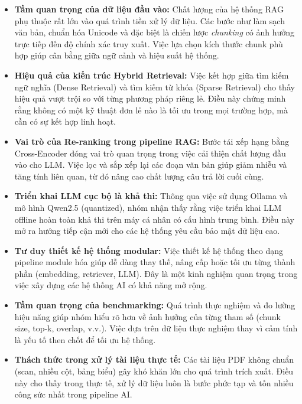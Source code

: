 ﻿\documentclass[10pt, conference, a4paper, compsocconf]{IEEEtran}
\begin{document}
\begin{itemize}

\item \textbf{Tầm quan trọng của dữ liệu đầu vào:} 
Chất lượng của hệ thống RAG phụ thuộc rất lớn vào quá trình tiền xử lý dữ liệu. Các bước như làm sạch văn bản, chuẩn hóa Unicode và đặc biệt là chiến lược \textit{chunking} có ảnh hưởng trực tiếp đến độ chính xác truy xuất. Việc lựa chọn kích thước chunk phù hợp giúp cân bằng giữa ngữ cảnh và hiệu suất hệ thống.

\item \textbf{Hiệu quả của kiến trúc Hybrid Retrieval:} 
Việc kết hợp giữa tìm kiếm ngữ nghĩa (Dense Retrieval) và tìm kiếm từ khóa (Sparse Retrieval) cho thấy hiệu quả vượt trội so với từng phương pháp riêng lẻ. Điều này chứng minh rằng không có một kỹ thuật đơn lẻ nào là tối ưu trong mọi trường hợp, mà cần có sự kết hợp linh hoạt.

\item \textbf{Vai trò của Re-ranking trong pipeline RAG:}
Bước tái xếp hạng bằng Cross-Encoder đóng vai trò quan trọng trong việc cải thiện chất lượng đầu vào cho LLM. Việc lọc và sắp xếp lại các đoạn văn bản giúp giảm nhiễu và tăng tính liên quan, từ đó nâng cao chất lượng câu trả lời cuối cùng.

\item \textbf{Triển khai LLM cục bộ là khả thi:}
Thông qua việc sử dụng Ollama và mô hình Qwen2.5 (quantized), nhóm nhận thấy rằng việc triển khai LLM offline hoàn toàn khả thi trên máy cá nhân có cấu hình trung bình. Điều này mở ra hướng tiếp cận mới cho các hệ thống yêu cầu bảo mật dữ liệu cao.

\item \textbf{Tư duy thiết kế hệ thống modular:}
Việc thiết kế hệ thống theo dạng pipeline module hóa giúp dễ dàng thay thế, nâng cấp hoặc tối ưu từng thành phần (embedding, retriever, LLM). Đây là một kinh nghiệm quan trọng trong việc xây dựng các hệ thống AI có khả năng mở rộng.

\item \textbf{Tầm quan trọng của benchmarking:}
Quá trình thực nghiệm và đo lường hiệu năng giúp nhóm hiểu rõ hơn về ảnh hưởng của từng tham số (chunk size, top-k, overlap, v.v.). Việc dựa trên dữ liệu thực nghiệm thay vì cảm tính là yếu tố then chốt để tối ưu hệ thống.

\item \textbf{Thách thức trong xử lý tài liệu thực tế:}
Các tài liệu PDF không chuẩn (scan, nhiều cột, bảng biểu) gây khó khăn lớn cho quá trình trích xuất. Điều này cho thấy trong thực tế, xử lý dữ liệu luôn là bước phức tạp và tốn nhiều công sức nhất trong pipeline AI.

\end{itemize}
\end{document}
